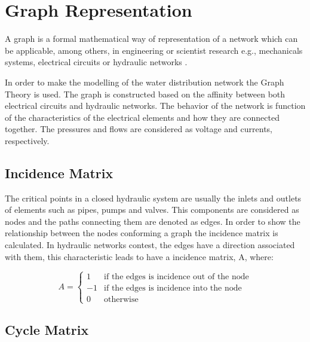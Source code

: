 \section{Graph Representation}  
\label{GraphTheory}
A graph is a formal mathematical way of representation of a network which can be applicable, among others, 
in engineering or scientist research e.g., mechanicals systems, electrical circuits or hydraulic networks \cite{graph_intro}. 

In order to make the modelling of the water distribution network the Graph Theory is used. The graph is constructed 
based on the affinity between both electrical circuits and hydraulic networks. 
The behavior of the network is function of the characteristics of the 
electrical elements and how they are connected together. The pressures and flows are considered as 
voltage and currents, respectively.

\subsection{Incidence Matrix} 

The critical points in a closed hydraulic system are usually the inlets and outlets of elements such as pipes, pumps and valves. 
This components are considered as nodes and the paths connecting them are denoted as edges. 
In order to show the relationship between the nodes conforming a graph the 
incidence matrix is calculated. In hydraulic networks contest, the edges have a 
direction associated with them, this characteristic leads to have a incidence matrix, A, where:

\begin{equation}
\label{DiGraph}
 A =
		\left\{
		\begin{array}{ll}
		
		1 			&      \text{if the edges is incidence out of the node}	
\\
		-1                       &     \text{if the edges is incidence into the node}
\\

                0                       &      \text{otherwise}

		\end{array}
		\right.
\end{equation}	


 
%
%

 
\subsection{Cycle Matrix} 
 